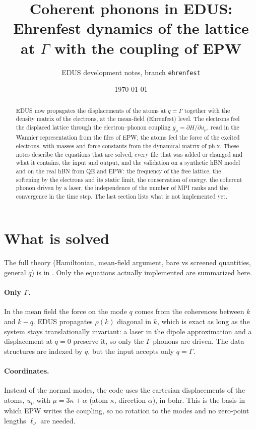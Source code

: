 \documentclass[11pt]{article}
\title{Coherent phonons in EDUS:\\ Ehrenfest dynamics of the lattice at $\Gamma$ with the coupling of EPW}
\author{EDUS development notes, branch \texttt{ehrenfest}}
\date{\today}
\begin{document}
\maketitle

\begin{abstract}
EDUS now propagates the displacements of the atoms at $q=\Gamma$ together with the density matrix of the electrons,
at the mean-field (Ehrenfest) level. The electrons feel the displaced lattice through the electron--phonon coupling
$g_\mu=\partial H/\partial u_\mu$, read in the Wannier representation from the files of EPW; the atoms feel the force
of the excited electrons, with masses and force constants from the dynamical matrix of ph.x. These notes describe the
equations that are solved, every file that was added or changed and what it contains, the input and output, and the
validation on a synthetic hBN model and on the real hBN from QE and EPW: the frequency of the free lattice, the softening by the electrons and its static
limit, the conservation of energy, the coherent phonon driven by a laser, the independence of the number of MPI ranks
and the convergence in the time step. The last section lists what is not implemented yet.
\end{abstract}

\tableofcontents

\section{What is solved}
The full theory (Hamiltonian, mean-field argument, bare vs screened quantities, general $q$) is in
. Only the equations actually implemented are summarized here.

\paragraph{Only $\Gamma$.} In the mean field the force on the mode $q$ comes from the coherences between $k$ and $k-q$.
EDUS propagates $\rho(k)$ diagonal in $k$, which is exact as long as the system stays translationally invariant: a laser
in the dipole approximation and a displacement at $q=0$ preserve it, so only the $\Gamma$ phonons are driven. The data
structures are indexed by $q$, but the input accepts only $q=\Gamma$.

\paragraph{Coordinates.} Instead of the normal modes, the code uses the cartesian displacements of the atoms,
$u_\mu$ with $\mu = 3\kappa+\alpha$ (atom $\kappa$, direction $\alpha$), in bohr. This is the basis in which EPW writes
the coupling, so no rotation to the modes and no zero-point lengths $\ell_\nu$ are needed.
\end{document}
